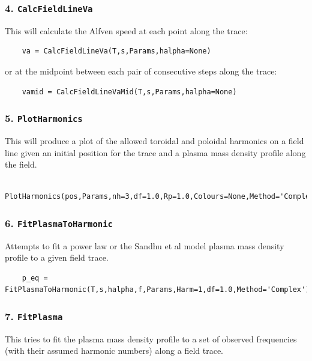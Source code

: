 	\subsubsection{4. \texttt{CalcFieldLineVa}}
	
	This will calculate the Alfven speed at each point along the trace:
	
	\begin{verbatim}
	va = CalcFieldLineVa(T,s,Params,halpha=None)
	\end{verbatim}
	
	or at the midpoint between each pair of consecutive steps along the trace:
	
	\begin{verbatim}
	vamid = CalcFieldLineVaMid(T,s,Params,halpha=None)
	\end{verbatim}
	
	\subsubsection{5. \texttt{PlotHarmonics}}
	
	This will produce a plot of the allowed toroidal and poloidal harmonics 
	on a field line given an initial position for the trace and a plasma
	mass density profile along the field.
	
	\begin{verbatim}
	PlotHarmonics(pos,Params,nh=3,df=1.0,Rp=1.0,Colours=None,Method='Complex',**kwargs)
	\end{verbatim}
	
	\subsubsection{6. \texttt{FitPlasmaToHarmonic}}
	
	Attempts to fit a power law or the Sandhu et al model plasma mass density
	profile to a given field trace.
	
	\begin{verbatim}
	p_eq = FitPlasmaToHarmonic(T,s,halpha,f,Params,Harm=1,df=1.0,Method='Complex')
	\end{verbatim}
	
	\subsubsection{7. \texttt{FitPlasma}}
	
	This tries to fit the plasma mass density profile to a set of observed
	frequencies (with their assumed harmonic numbers) along a field trace.
	
